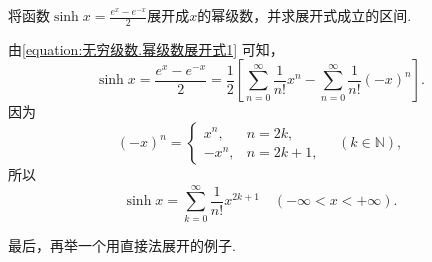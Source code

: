 \begin{example}
将函数\(\sinh x = \frac{e^x - e^{-x}}{2}\)展开成\(x\)的幂级数，并求展开式成立的区间.
\begin{solution}
由\cref{equation:无穷级数.幂级数展开式1} 可知，\[
\sinh x
= \frac{e^x - e^{-x}}{2}
= \frac{1}{2} \left[
\sum\limits_{n=0}^{\infty} \frac{1}{n!} x^n
- \sum\limits_{n=0}^{\infty} \frac{1}{n!} (-x)^n
\right].
\]因为\[
(-x)^n = \left\{ \begin{array}{cl}
x^n, & n=2k, \\
-x^n, & n=2k+1,
\end{array} \right.
\quad (k\in\mathbb{N}),
\]所以\[
\sinh x
= \sum\limits_{k=0}^{\infty} \frac{1}{n!} x^{2k+1}
\quad (-\infty<x<+\infty).
\]
\end{solution}
\end{example}

最后，再举一个用直接法展开的例子.

